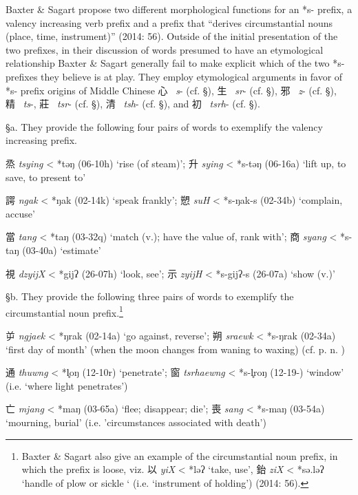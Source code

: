 Baxter \& Sagart propose two different morphological functions for an
*s- prefix, a valency increasing verb prefix and a prefix that ``derives
circumstantial nouns (place, time, instrument)'' (2014: 56). Outside of
the initial presentation of the two prefixes, in their discussion of
words presumed to have an etymological relationship Baxter \& Sagart
generally fail to make explicit which of the two *s- prefixes they
believe is at play. They employ etymological arguments in favor of *s-
prefix origins of Middle Chinese 心~ \emph{s}- (cf. §), 生~ \emph{sr}-
(cf. §), 邪~ \emph{z}- (cf. §), 精~ \emph{ts}-, 莊~ \emph{tsr}- (cf. §),
清~ \emph{tsh}- (cf. §), and 初~ \emph{tsrh}- (cf. §).

§a. They provide the following four pairs of words to exemplify the
valency increasing prefix.

\begin{description} \item
烝 \emph{tsying} \textless{} *təŋ (06-10h) `rise (of steam)'; 升
 \emph{sying} \textless{} *s-təŋ (06-16a) `lift up, to save, to present
to'
\item
諤 \emph{ngak} \textless{} *ŋ{}ak (02-14k) `speak frankly'; 愬 \emph{suH}
\textless{} *s-ŋ{}ak-s (02-34b) `complain, accuse'
\item
當 \emph{tang} \textless{} *t{}aŋ (03-32q) `match (v.); have the value
of, rank with'; 商 \emph{syang} \textless{} *s-taŋ (03-40a) `estimate'
\item
視 \emph{dzyijX} \textless{} *gijʔ (26-07h) `look, see'; 示 \emph{zyijH}
\textless{} *s-gijʔ-s (26-07a) `show (v.)'
\end{description}

§b. They provide the following three pairs of words to exemplify the
circumstantial noun prefix.\footnote{Baxter \& Sagart also give an
  example of the circumstantial noun prefix, in which the prefix is
  loose, viz. 以  \emph{yiX} \textless{} *ləʔ `take, use', 鈶 \emph{ziX}
  \textless{} *sə.ləʔ `handle of plow or sickle ` (i.e. `instrument of
  holding') (2014: 56).}

\begin{description} \item
屰 \emph{ngjaek} \textless{} *ŋrak (02-14a) `go against, reverse'; 朔
 \emph{sraewk} \textless{} *s-ŋrak (02-34a) `first day of month' (when
the moon changes from waning to waxing) (cf. p. n. )
\item
通 \emph{thuwng} \textless{} *l̥{}oŋ (12-10r) `penetrate'; 窗
 \emph{tsrhaewng} \textless{} *s-l̥{}roŋ (12-19-) `window' (i.e. `where
light penetrates')
\item
亡 \emph{mjang} \textless{} *maŋ (03-65a) `flee; disappear; die'; 喪
 \emph{sang} \textless{} *s-m{}aŋ (03-54a) `mourning, burial' (i.e.
'circumstances associated with death')
\end{description}

